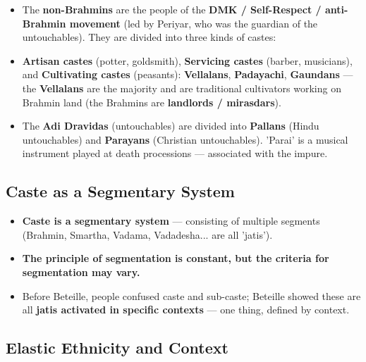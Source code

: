 \begin{KeyConcept}
\begin{itemize}
\item The \textbf{non-Brahmins} are the people of the \textbf{DMK / Self-Respect / anti-Brahmin movement} (led by Periyar, who was the guardian of the untouchables). They are divided into three kinds of castes:
\item \textbf{Artisan castes} (potter, goldsmith), \textbf{Servicing castes} (barber, musicians), and \textbf{Cultivating castes} (peasants): \textbf{Vellalans}, \textbf{Padayachi}, \textbf{Gaundans} --- the \textbf{Vellalans} are the majority and are traditional cultivators working on Brahmin land (the Brahmins are \textbf{landlords / mirasdars}).
\item The \textbf{Adi Dravidas} (untouchables) are divided into \textbf{Pallans} (Hindu untouchables) and \textbf{Parayans} (Christian untouchables). 'Parai' is a musical instrument played at death processions --- associated with the impure.
\end{itemize}
\end{KeyConcept}

\subsection{Caste as a Segmentary System}

\begin{KeyConcept}
\begin{itemize}
\item \textbf{Caste is a segmentary system} --- consisting of multiple segments (Brahmin, Smartha, Vadama, Vadadesha... are all 'jatis').
\item \textbf{The principle of segmentation is constant, but the criteria for segmentation may vary.}
\item Before Beteille, people confused caste and sub-caste; Beteille showed these are all \textbf{jatis activated in specific contexts} --- one thing, defined by context.
\end{itemize}
\end{KeyConcept}

\subsection{Elastic Ethnicity and Context}

